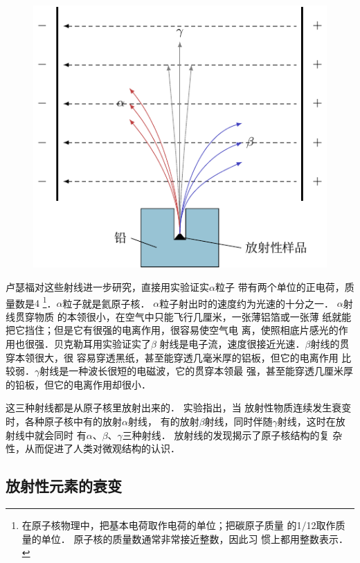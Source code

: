 \begin{figure}[htbp]
    \centering
    \includegraphics{fig/C/9-1.pdf}
    \caption{}\label{fig_C_9-1}
\end{figure}

卢瑟福对这些射线进一步研究，直接用实验证实$\alpha$粒子
带有两个单位的正电荷，质量数是$4$ \footnote{在原子核物理中，把基本电荷取作电荷的单位；把碳原子质量
的1/12取作质量的单位．
原子核的质量数通常非常接近整数，因此习
惯上都用整数表示．}．$\alpha$粒子就是氦原子核．
$\alpha$粒子射出时的速度约为光速的十分之一．
$\alpha$射线贯穿物质
的本领很小，在空气中只能飞行几厘米，一张薄铝箔或一张薄
纸就能把它挡住；但是它有很强的电离作用，很容易使空气电
离，使照相底片感光的作用也很强．贝克勒耳用实验证实了$\beta$
射线是电子流，速度很接近光速．$\beta$射线的贯穿本领很大，很
容易穿透黑纸，甚至能穿透几毫米厚的铝板，但它的电离作用
比较弱．$\gamma$射线是一种波长很短的电磁波，它的贯穿本领最
强，甚至能穿透几厘米厚的铅板，但它的电离作用却很小．

这三种射线都是从原子核里放射出来的．
实验指出，当
放射性物质连续发生衰变时，各种原子核中有的放射$\alpha$射线，
有的放射$\beta$射线，同时伴随$\gamma$射线，这时在放射线中就会同时
有$\alpha$、$\beta$、$\gamma$三种射线．
放射线的发现揭示了原子核结构的复
杂性，从而促进了人类对微观结构的认识．

\subsection{放射性元素的衰变}

